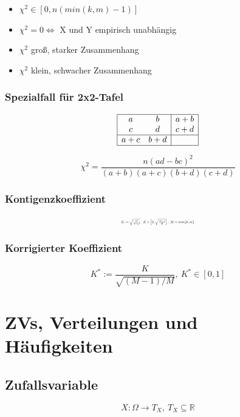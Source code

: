 \documentclass[10pt,a4paper,landscape]{article}
\begin{document}
\begin{multicols}{4}
\begin{itemize}
\item $\chi^2 \in [0, n(min(k,m)-1)]$
\item $\chi^2=0 \Leftrightarrow$ X und Y empirisch unabhängig
\item $\chi^2$ groß, starker Zusammenhang
\item $\chi^2$ klein, schwacher Zusammenhang
\end{itemize}

\subsubsection*{Spezialfall für 2x2-Tafel}
\[
\begin{array}{|cc|c|}
\hline
a & b & a+b \\
c & d & c+d \\
\hline
a+c & b+d & \\
\hline
\end{array}
\]

\[
\chi^2 = \frac{n(ad-bc)^2}{(a+b)(a+c)(b+d)(c+d)}
\]

\subsubsection*{Kontigenzkoeffizient}
\[ \resizebox{0.25\textwidth}{!}{$
K := \sqrt{\frac{\chi^2}{n+\chi^2}}, ~K \in \left[0, \sqrt{\frac{M-1}{M}}\right],~ M=min\{k, m\}
$}
\]

\subsubsection*{Korrigierter Koeffizient}
\[
K^* := \frac{K}{\sqrt{(M-1)/M}}, ~ K^* \in [0, 1]
\]


\section{ZVs, Verteilungen und Häufigkeiten}

\subsection{Zufallsvariable}
\[
X:\Omega \rightarrow T_X , ~ T_X\subseteq \mathbb{R}
\]


\end{multicols}
\end{document}
